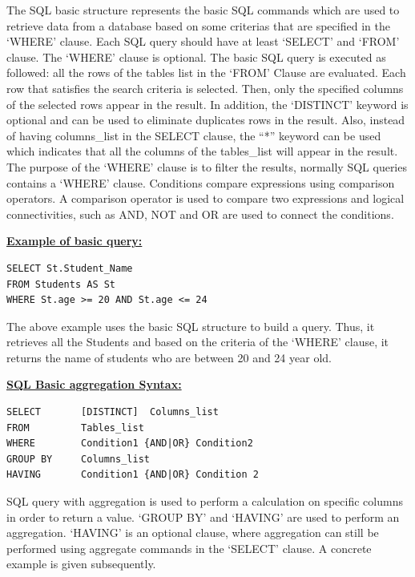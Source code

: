 The SQL basic structure represents the basic SQL commands which are used to retrieve data from a database based on some criterias  that are specified  in the ‘WHERE’ clause. Each SQL query should have at least ‘SELECT’ and ‘FROM’ clause.  The ‘WHERE’ clause is optional. The basic SQL query is executed as followed: all the rows of the tables list in the ‘FROM’ Clause are evaluated. Each row that satisfies the search criteria is selected. Then, only the specified columns of the selected rows appear in the result. In addition,  the ‘DISTINCT’ keyword is optional and can be used to eliminate duplicates rows in the result. Also, instead of having columns\_list in the SELECT clause, the “*” keyword can be used which indicates that all the columns of the tables\_list will appear in the result. The purpose of the ‘WHERE’ clause is to filter the results, normally SQL queries contains a ‘WHERE’ clause. Conditions compare expressions using comparison operators. A comparison operator is used to compare two expressions and logical connectivities, such as AND, NOT and OR are used to connect the conditions.  

\hfill\newline
\noindent\textbf{\underline{Example of basic query:}}
\begin{mdframed}[backgroundcolor=lightgray!20] 
\begin{lstlisting}[style=SQL]
SELECT St.Student_Name
FROM Students AS St 
WHERE St.age >= 20 AND St.age <= 24
\end{lstlisting}
\end{mdframed}

The above example uses the basic SQL structure to build a query. Thus, it retrieves all the Students and based on the criteria of the ‘WHERE’ clause, it returns the name of students who are between 20 and 24 year old. 

\hfill\newline
\noindent\textbf{\underline{SQL Basic aggregation Syntax:}}
\begin{mdframed}[backgroundcolor=lightgray!20] 
\begin{lstlisting}[style=SQL]
SELECT       [DISTINCT]  Columns_list
FROM         Tables_list
WHERE        Condition1 {AND|OR} Condition2
GROUP BY     Columns_list
HAVING       Condition1 {AND|OR} Condition 2
\end{lstlisting}
\end{mdframed}

SQL query with aggregation is used to perform a calculation on specific columns in order to return a value. ‘GROUP BY’ and ‘HAVING’ are used to perform an aggregation. ‘HAVING’ is an optional clause, where aggregation can still be performed using aggregate commands in the ‘SELECT’ clause. A concrete example is given subsequently. 

